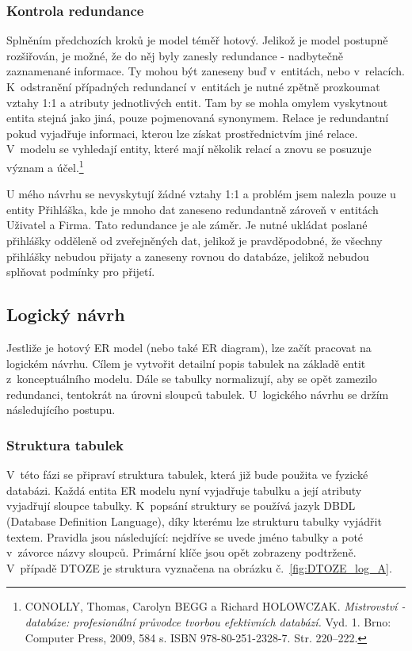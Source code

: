 \documentclass[11pt,a4paper]{article}
\begin{document}
\subsubsection{Kontrola redundance}
Splněním předchozích kroků je model téměř hotový. Jelikož je model postupně rozšiřován, je možné, že do něj byly zanesly redundance - nadbytečně zaznamenané informace. Ty mohou být zaneseny buď v~entitách, nebo v~relacích. K~odstranění případných redundancí v~entitách je nutné zpětně prozkoumat vztahy 1:1 a atributy jednotlivých entit. Tam by se mohla omylem vyskytnout entita stejná jako jiná, pouze pojmenovaná synonymem. Relace je redundantní pokud vyjadřuje informaci, kterou lze získat prostřednictvím jiné relace. V~modelu se vyhledají entity, které mají několik relací a znovu se posuzuje význam a účel.\footnote{CONOLLY, Thomas, Carolyn BEGG a Richard HOLOWCZAK. \textit{Mistrovství - databáze: profesionální průvodce tvorbou efektivních databází.} Vyd. 1. Brno: Computer Press, 2009, 584 s. ISBN 978-80-251-2328-7. Str. 220–222.}

U mého návrhu se nevyskytují žádné vztahy 1:1 a problém jsem nalezla pouze u entity Přihláška, kde je mnoho dat zaneseno redundantně zároveň v entitách Uživatel a Firma. Tato redundance je ale záměr. Je nutné ukládat poslané přihlášky odděleně od zveřejněných dat, jelikož je pravděpodobné, že všechny přihlášky nebudou přijaty a zaneseny rovnou do databáze, jelikož nebudou splňovat podmínky pro přijetí.

\subsection{Logický návrh}
Jestliže je hotový ER model (nebo také ER diagram), lze začít pracovat na logickém návrhu. Cílem je vytvořit detailní popis tabulek na základě entit z~konceptuálního modelu. Dále se tabulky normalizují, aby se opět zamezilo redundanci, tentokrát na úrovni sloupců tabulek. U~logického návrhu se držím následujícího postupu.

\subsubsection{Struktura tabulek}
V~této fázi se připraví struktura tabulek, která již bude použita ve fyzické databázi. Každá entita ER modelu nyní vyjadřuje tabulku a její atributy vyjadřují sloupce tabulky. K~popsání struktury se používá jazyk DBDL (Database Definition Language), díky kterému lze strukturu tabulky vyjádřit textem. Pravidla jsou následující: nejdříve se uvede jméno tabulky a poté v~závorce názvy sloupců. Primární klíče jsou opět zobrazeny podtrženě. V~případě DTOZE je struktura vyznačena na obrázku č.~\ref{fig:DTOZE_log_A}. 
\end{document}
